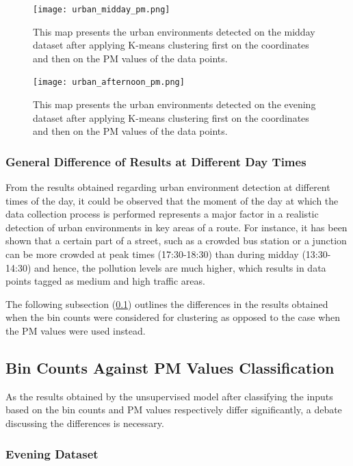\documentclass[bsc,frontabs,twoside,singlespacing, parskip,deptreport]{infthesis}     %
\begin{document}
\begin{figure}[h!]
  \center
  \texttt{[image: urban\_midday\_pm.png]}
  \caption{This map presents the urban environments detected on the midday dataset after applying K-means clustering first on the coordinates and then on the PM values of the data points.}
  \label{fig:urban_midday_pm}
\end{figure}

\begin{figure}[h!]
  \center
  \texttt{[image: urban\_afternoon\_pm.png]}
  \caption{This map presents the urban environments detected on the evening dataset after applying K-means clustering first on the coordinates and then on the PM values of the data points.}
  \label{fig:urban_afternoon_pm}
\end{figure}

\subsubsection*{General Difference of Results at Different Day Times}

From the results obtained regarding urban environment detection at different times of the day, it could be observed that the moment of the day at which the data collection process is performed represents a major factor in a realistic detection of urban environments in key areas of a route. For instance, it has been shown that a certain part of a street, such as a crowded bus station or a junction can be more crowded at peak times (17:30-18:30) than during midday (13:30-14:30) and hence, the pollution levels are much higher, which results in data points tagged as medium and high traffic areas.

The following subsection (\ref{subsec:bin-counts-pm-vals}) outlines the differences in the results obtained when the bin counts were considered for clustering as opposed to the case when the PM values were used instead.

\subsection{Bin Counts Against PM Values Classification}
\label{subsec:bin-counts-pm-vals}

As the results obtained by the unsupervised model after classifying the inputs based on the bin counts and PM values respectively differ significantly, a debate discussing the differences is necessary. 

\subsubsection*{Evening Dataset}
\end{document}
